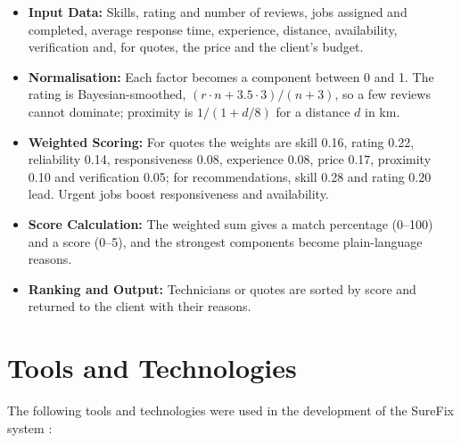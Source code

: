 \documentclass[A4paper,12pt]{report}
\theoremstyle{plain}
\theoremstyle{definition}
\theoremstyle{remark}
\numberwithin{equation}{section}
\begin{document}
\begin{itemize}
        \item \textbf{Input Data:} Skills, rating and number of reviews, jobs assigned and completed, average response time, experience, distance, availability, verification and, for quotes, the price and the client's budget.

    \item \textbf{Normalisation:} Each factor becomes a component between 0 and 1. The rating is Bayesian-smoothed, $(r \cdot n + 3.5 \cdot 3)/(n+3)$, so a few reviews cannot dominate; proximity is $1/(1+d/8)$ for a distance $d$ in km.

    \item \textbf{Weighted Scoring:} For quotes the weights are skill 0.16, rating 0.22, reliability 0.14, responsiveness 0.08, experience 0.08, price 0.17, proximity 0.10 and verification 0.05; for recommendations, skill 0.28 and rating 0.20 lead. Urgent jobs boost responsiveness and availability.

    \item \textbf{Score Calculation:} The weighted sum gives a match percentage (0–100) and a score (0–5), and the strongest components become plain-language reasons.

    \item \textbf{Ranking and Output:} Technicians or quotes are sorted by score and returned to the client with their reasons.
\end{itemize}


\section{Tools and Technologies}

The following tools and technologies were used in the development of the SureFix system \cite{13,14,15,16,17}:
\end{document}
